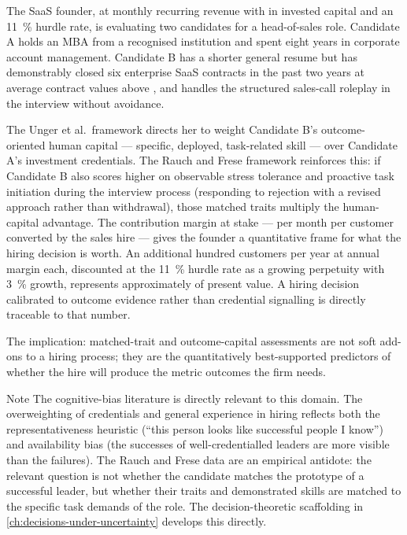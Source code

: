 \begin{example}
The SaaS founder, at  monthly recurring revenue with  in invested
capital and an \qty{11}{\percent} hurdle rate, is evaluating two candidates for a head-of-sales
role. Candidate A holds an MBA from a recognised institution and spent eight years in corporate
account management. Candidate B has a shorter general resume but has demonstrably closed six
enterprise SaaS contracts in the past two years at average contract values above ,
and handles the structured sales-call roleplay in the interview without avoidance.

The Unger et al.\ framework directs her to weight Candidate B's outcome-oriented human capital
--- specific, deployed, task-related skill --- over Candidate A's investment credentials. The
Rauch and Frese framework reinforces this: if Candidate B also scores higher on observable
stress tolerance and proactive task initiation during the interview process (responding to
rejection with a revised approach rather than withdrawal), those matched traits multiply the
human-capital advantage. The contribution margin at stake ---  per month per customer
converted by the sales hire --- gives the founder a quantitative frame for what the hiring
decision is worth. An additional hundred customers per year at  annual margin each,
discounted at the \qty{11}{\percent} hurdle rate as a growing perpetuity with \qty{3}{\percent}
growth, represents approximately  of present value. A hiring decision calibrated
to outcome evidence rather than credential signalling is directly traceable to that number.

The implication: matched-trait and outcome-capital assessments are not soft add-ons to a hiring
process; they are the quantitatively best-supported predictors of whether the hire will produce
the metric outcomes the firm needs.
\end{example}

\begin{admonition}{Note}
The cognitive-bias literature is directly relevant to this domain. The overweighting of
credentials and general experience in hiring reflects both the representativeness heuristic
(``this person looks like successful people I know'') and availability bias (the successes of
well-credentialled leaders are more visible than the failures). The Rauch and Frese data are an
empirical antidote: the relevant question is not whether the candidate matches the prototype of
a successful leader, but whether their traits and demonstrated skills are matched to the
specific task demands of the role. The decision-theoretic scaffolding in
\cref{ch:decisions-under-uncertainty} develops this directly.
\end{admonition}

